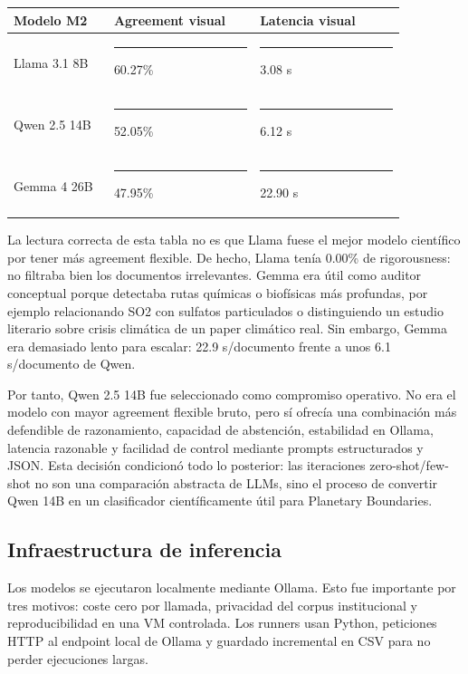 \begin{center}
\scriptsize
\setlength{\tabcolsep}{5pt}
\renewcommand{\arraystretch}{1.2}
\begin{tabular}{p{0.22\linewidth}p{0.32\linewidth}p{0.32\linewidth}}
\toprule
Modelo M2 & Agreement visual & Latencia visual \\
\midrule
Llama 3.1 8B & \rule{3.50cm}{0.8ex} 60.27\% & \rule{0.51cm}{0.8ex} 3.08 s \\
Qwen 2.5 14B & \rule{3.02cm}{0.8ex} 52.05\% & \rule{1.02cm}{0.8ex} 6.12 s \\
Gemma 4 26B & \rule{2.78cm}{0.8ex} 47.95\% & \rule{3.80cm}{0.8ex} 22.90 s \\
\bottomrule
\end{tabular}
\end{center}

La lectura correcta de esta tabla no es que Llama fuese el mejor modelo científico por tener más agreement flexible. De hecho, Llama tenía 0.00\% de rigorousness: no filtraba bien los documentos irrelevantes. Gemma era útil como auditor conceptual porque detectaba rutas químicas o biofísicas más profundas, por ejemplo relacionando SO2 con sulfatos particulados o distinguiendo un estudio literario sobre crisis climática de un paper climático real. Sin embargo, Gemma era demasiado lento para escalar: 22.9 s/documento frente a unos 6.1 s/documento de Qwen.

Por tanto, Qwen 2.5 14B fue seleccionado como compromiso operativo. No era el modelo con mayor agreement flexible bruto, pero sí ofrecía una combinación más defendible de razonamiento, capacidad de abstención, estabilidad en Ollama, latencia razonable y facilidad de control mediante prompts estructurados y JSON. Esta decisión condicionó todo lo posterior: las iteraciones zero-shot/few-shot no son una comparación abstracta de LLMs, sino el proceso de convertir Qwen 14B en un clasificador científicamente útil para Planetary Boundaries.

\subsection{Infraestructura de inferencia}

Los modelos se ejecutaron localmente mediante Ollama. Esto fue importante por tres motivos: coste cero por llamada, privacidad del corpus institucional y reproducibilidad en una VM controlada. Los runners usan Python, peticiones HTTP al endpoint local de Ollama y guardado incremental en CSV para no perder ejecuciones largas.

